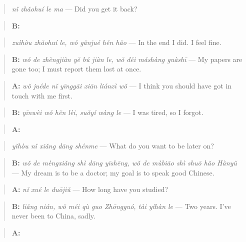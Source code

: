 \begin{quote}
\emph{nǐ zhǎohuí le ma} — Did you get it back?
\end{quote}

\begin{quote}
\textbf{B:}  
\end{quote}

\begin{quote}
\emph{zuìhòu zhǎohuí le, wǒ gǎnjué hěn hǎo} — In the end I did. I feel fine.
\end{quote}

\begin{quote}
\textbf{B:} \emph{wǒ de zhèngjiàn yě bú jiàn le, wǒ děi mǎshàng guàshī} — My papers are gone too; I must report them lost at once.
\end{quote}

\begin{quote}
\textbf{A:} \emph{wǒ juéde nǐ yīnggāi xiān liánxì wǒ} — I think you should have got in touch with me first.
\end{quote}

\begin{quote}
\textbf{B:} \emph{yīnwèi wǒ hěn lèi, suǒyǐ wàng le} — I was tired, so I forgot.
\end{quote}

\begin{quote}
\textbf{A:} 
\end{quote}

\begin{quote}
\emph{yǐhòu nǐ xiǎng dāng shénme} — What do you want to be later on?
\end{quote}

\begin{quote}
\textbf{B:} \emph{wǒ de mèngxiǎng shì dāng yīshēng, wǒ de mùbiāo shì shuō hǎo Hànyǔ} — My dream is to be a doctor; my goal is to speak good Chinese.
\end{quote}

\begin{quote}
\textbf{A:} \emph{nǐ xué le duōjiǔ} — How long have you studied?
\end{quote}

\begin{quote}
\textbf{B:} \emph{liǎng nián, wǒ méi qù guo Zhōngguó, tài yíhàn le} — Two years. I've never been to China, sadly.
\end{quote}

\begin{quote}
\textbf{A:}  
\end{quote}

